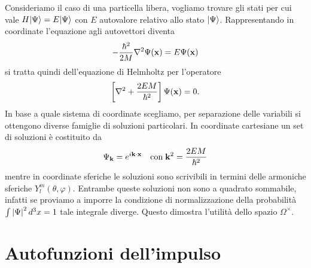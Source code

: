 Consideriamo il caso di una particella libera, vogliamo trovare gli stati per cui vale $ H\vert \Psi \rangle = E \vert \Psi \rangle $ con $ E $ autovalore relativo allo stato 
$ \vert \Psi \rangle $. Rappresentando in coordinate l'equazione agli autovettori diventa 
\begin{align*}
  -\frac{\hbar^2}{2M} \nabla^2 \Psi(\mathbf{x}) = E \Psi(\mathbf{x})
\end{align*}
si tratta quindi dell'equazione di Helmholtz per l'operatore 
\begin{align*}
  \left[ \nabla^2 + \frac{2 E M}{\hbar^2} \right] \Psi(\mathbf{x}) = 0.
\end{align*}
In base a quale sistema di coordinate scegliamo, per separazione delle variabili si ottengono diverse famiglie di soluzioni particolari. In coordinate 
cartesiane un set di soluzioni è costituito da 
\begin{align*}
  \Psi_{\mathbf{k}} = e^{i \mathbf{k \cdot x}} \quad \textnormal{con}\; \mathbf{k}^2 = \frac{2 E M}{\hbar^2} 
\end{align*}
mentre in coordinate sferiche le soluzioni sono scrivibili in termini delle armoniche sferiche $ Y_{l}^{m}(\theta, \varphi) $. Entrambe queste soluzioni 
non sono a quadrato sommabile, infatti se proviamo a imporre la condizione di normalizzazione della probabilità $ \int\left|{\Psi}\right|^2 d^3 x = 1 $ tale 
integrale diverge. Questo dimostra l'utilità dello spazio $ \Omega^\times $.

\section{Autofunzioni dell'impulso}

